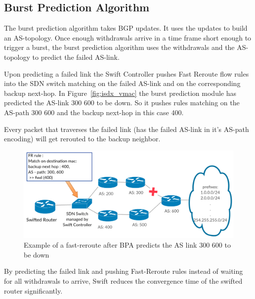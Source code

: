 \subsection{\label{chapter2:Swift:BPA}Burst Prediction Algorithm}
The burst prediction algorithm takes BGP updates. It uses the updates to build an AS-topology. Once enough withdrawals arrive in a time frame short enough to trigger a burst, the burst prediction algorithm uses the withdrawals and the AS-topology to predict the failed AS-link.

Upon predicting a failed link the Swift Controller pushes Fast Reroute flow rules into the SDN switch matching on the failed AS-link and on the corresponding backup next-hop. In Figure~\ref{fig:isdx_vmac} the burst prediction module has predicted the AS-link 300 600 to be down. So it pushes rules matching on the AS-path 300 600 and the backup next-hop in this case 400.

Every packet that traverses the failed link (has the failed AS-link in it's AS-path encoding) will get rerouted to the backup neighbor.
\begin{figure}[h]
\center
\includegraphics[scale = 0.36]{Figures/bckgrnd_swift_fr.pdf}
\caption{Example of a fast-reroute after BPA predicts the AS link 300 600 to be down}
\label{fig:swift_FR}
\end{figure}

By predicting the failed link and pushing Fast-Reroute rules instead of waiting for all withdrawals to arrive, Swift reduces the convergence time of the swifted router significantly.






